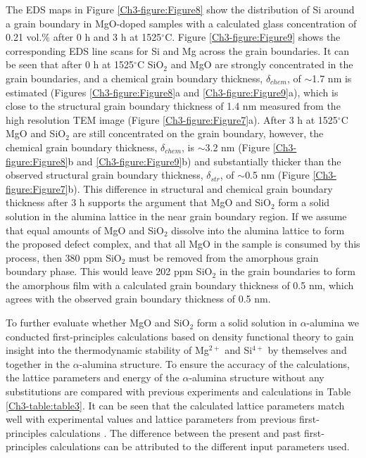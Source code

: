 The EDS maps in Figure \ref{Ch3-figure:Figure8} show the distribution of Si around a grain boundary in MgO-doped samples with a calculated glass concentration of 0.21 vol.\% after 0 h and 3 h at 1525$^{\circ}$C. Figure \ref{Ch3-figure:Figure9} shows the corresponding EDS line scans for Si and Mg across the grain boundaries. It can be seen that after 0 h at 1525$^{\circ}$C SiO$_{2}$ and MgO are strongly concentrated in the grain boundaries, and a chemical grain boundary thickness, $\delta_{chem}$, of $\sim$1.7 nm is estimated (Figures \ref{Ch3-figure:Figure8}a and \ref{Ch3-figure:Figure9}a), which is close to the structural grain boundary thickness of 1.4 nm measured from the high resolution TEM image (Figure \ref{Ch3-figure:Figure7}a). After 3 h at 1525$^{\circ}$C MgO and SiO$_{2}$ are still concentrated on the grain boundary, however, the chemical grain boundary thickness, $\delta_{chem}$, is $\sim$3.2 nm (Figure \ref{Ch3-figure:Figure8}b and \ref{Ch3-figure:Figure9}b) and substantially thicker than the observed structural grain boundary thickness, $\delta_{str}$, of $\sim$0.5 nm (Figure \ref{Ch3-figure:Figure7}b). This difference in structural and chemical grain boundary thickness after 3 h supports the argument that MgO and SiO$_{2}$ form a solid solution in the alumina lattice in the near grain boundary region. If we assume that equal amounts of MgO and SiO$_{2}$ dissolve into the alumina lattice to form the proposed defect complex, and that all MgO in the sample is consumed by this process, then 380 ppm SiO$_{2}$ must be removed from the amorphous grain boundary phase. This would leave 202 ppm SiO$_{2}$ in the grain boundaries to form the amorphous film with a calculated grain boundary thickness of 0.5 nm, which agrees with the observed grain boundary thickness of 0.5 nm.

To further evaluate whether MgO and SiO$_{2}$ form a solid solution in $\alpha$-alumina we conducted first-principles calculations based on density functional theory to gain insight into the thermodynamic stability of Mg$^{2+}$ and Si$^{4+}$ by themselves and together in the $\alpha$-alumina structure. To ensure the accuracy of the calculations, the lattice parameters and energy of the $\alpha$-alumina structure without any substitutions are compared with previous experiments and calculations in Table \ref{Ch3-table:table3}. It can be seen that the calculated lattice parameters match well with experimental values and lattice parameters from previous first-principles calculations \cite{Jain2013,MaterialsProject,Graham1960_595,Bergerhoff1983,Karlsruhe,Atkinson2003}. The difference between the present and past first-principles calculations can be attributed to the different input parameters used. 

